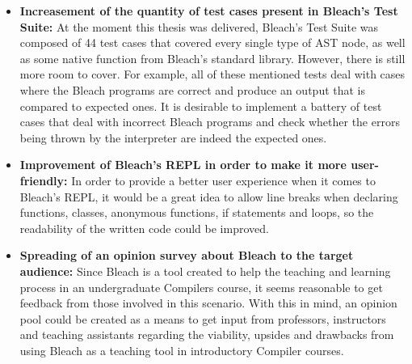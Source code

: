 \begin{itemize}
    \item \textbf{Increasement of the quantity of test cases present in Bleach's Test Suite:} At the moment this thesis was delivered, Bleach's Test Suite was composed of 44 test cases that covered every single type of AST node, as well as some native function from Bleach's standard library. However, there is still more room to cover. For example, all of these mentioned tests deal with cases where the Bleach programs are correct and produce an output that is compared to expected ones. It is desirable to implement a battery of test cases that deal with incorrect Bleach programs and check whether the errors being thrown by the interpreter are indeed the expected ones.

    \item \textbf{Improvement of Bleach's REPL in order to make it more user-friendly:} In order to provide a better user experience when it comes to Bleach's REPL, it would be a great idea to allow line breaks when declaring functions, classes, anonymous functions, if statements and loops, so the readability of the written code could be improved.

    \item \textbf{Spreading of an opinion survey about Bleach to the target audience:} Since Bleach is a tool created to help the teaching and learning process in an undergraduate Compilers course, it seems reasonable to get feedback from those involved in this scenario. With this in mind, an opinion pool could be created as a means to get input from professors, instructors and teaching assistants regarding the viability, upsides and drawbacks from using Bleach as a teaching tool in introductory Compiler courses.
\end{itemize}

